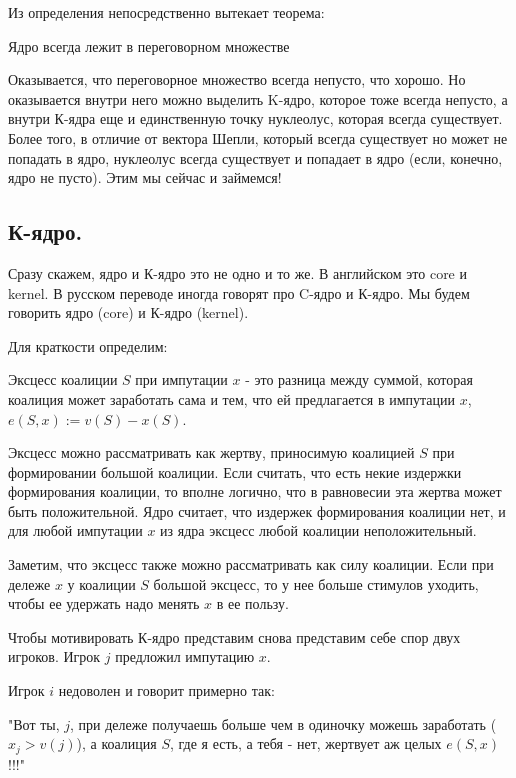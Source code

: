Из определения непосредственно вытекает теорема:
\begin{definition}
Ядро всегда лежит в переговорном множестве
\end{definition}

Оказывается, что переговорное множество всегда непусто, что хорошо. Но оказывается внутри него можно выделить K-ядро, которое тоже всегда непусто, а внутри К-ядра еще и единственную точку нуклеолус, которая всегда существует. Более того, в отличие от вектора Шепли, который всегда существует но может не попадать в ядро, нуклеолус всегда существует и попадает в ядро (если, конечно, ядро не пусто). Этим мы сейчас и займемся!

\subsection{К-ядро.}

Сразу скажем, ядро и К-ядро это не одно и то же. В английском это core и kernel. В русском переводе иногда говорят про C-ядро и К-ядро. Мы будем говорить ядро (core) и К-ядро (kernel).

Для краткости определим:
\begin{definition}
Эксцесс коалиции $S$ при импутации $x$ - это разница между суммой, которая коалиция может заработать сама и тем, что ей предлагается в импутации $x$, $e(S,x):=v(S)-x(S)$.
\end{definition}

Эксцесс можно рассматривать как жертву, приносимую коалицией $S$ при формировании большой коалиции. Если считать, что есть некие издержки формирования коалиции, то вполне логично, что в равновесии эта жертва может быть положительной. Ядро считает, что издержек формирования коалиции нет, и для любой импутации $x$ из ядра эксцесс любой коалиции неположительный.

Заметим, что эксцесс также можно рассматривать как силу коалиции. Если при дележе $x$ у коалиции $S$ большой эксцесс, то у нее больше стимулов уходить, чтобы ее удержать надо менять $x$ в ее пользу.

Чтобы мотивировать К-ядро представим снова представим себе спор двух игроков. Игрок $j$ предложил импутацию $x$. 

Игрок $i$ недоволен и говорит примерно так: 

"Вот ты, $j$, при дележе получаешь больше чем в одиночку можешь заработать ($x_{j}>v(j)$), а коалиция $S$, где я есть, а тебя - нет, жертвует аж целых $e(S,x)$!!!"

